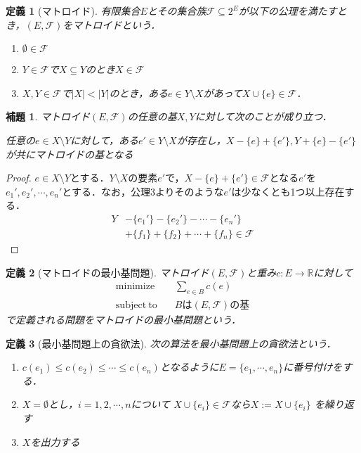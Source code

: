 \documentclass[a4paper]{jsarticle}
\newcommand{\abs}[1]{ \left| #1 \right| }
\theoremstyle{break}
\newtheorem{defi}{定義}[section]
\newtheorem{lemm}{補題}[section]
\newtheorem{proof}{証明}[section]
\begin{document}
\begin{defi}[マトロイド] 
  有限集合$E$とその集合族$\mathcal{F} \subseteq 2^E$が以下の公理を満たすとき，$(E,\mathcal{F})$をマトロイドという．
  \begin{enumerate}
    \item $\emptyset \in \mathcal{F}$
    \item $Y\in \mathcal{F}$で$X\subseteq Y$のとき$X\in \mathcal{F}$
    \item $X,Y\in \mathcal{F}$で$\abs{X}<\abs{Y}$のとき，ある$e\in Y\setminus X$があって$X\cup \{e\} \in \mathcal{F}$．
  \end{enumerate}
\end{defi}

\begin{lemm}
  マトロイド$(E,\mathcal{F})$の任意の基$X,Y$に対して次のことが成り立つ．

  任意の$e\in X\setminus Y$に対して，ある$e'\in Y\setminus X$が存在し，$X-\{e\}+\{e'\},Y+\{e\}-\{e'\}$が共にマトロイドの基となる
\end{lemm}
\begin{proof}
  $e\in X\setminus Y$とする．$Y\setminus X$の要素$e'$で，$X-\{e\}+\{e'\}\in \mathcal{F}$となる$e'$を$e_1',e_2',\cdots,e_n'$とする．なお，公理3よりそのような$e'$は少なくとも1つ以上存在する．
  \begin{align*}
    Y &- \{e_1'\} - \{e_2'\} - \cdots - \{e_n'\}  \\
      & + \{f_1\} + \{f_2\} + \cdots + \{f_n\} \in \mathcal{F}
  \end{align*}
\end{proof}

\begin{defi}[マトロイドの最小基問題] 
  マトロイド$(E,\mathcal{F})$と重み$c\colon E\to \mathbb{R}$に対して
  \begin{align*}
    \mathrm{minimize} &\quad  \sum_{e\in B} c(e) \\
    \mathrm{subject\ to}  &\quad  Bは(E,\mathcal{F})の基
  \end{align*}
  で定義される問題をマトロイドの最小基問題という．
\end{defi}
\begin{defi}[最小基問題上の貪欲法] 
  次の算法を最小基問題上の貪欲法という．
  \begin{enumerate}
    \item $c(e_1) \leq c(e_2) \leq \cdots \leq c(e_n)$となるように$E=\{e_1,\cdots,e_n\}$に番号付けをする．
    \item $X=\emptyset$とし，$i=1,2,\cdots,n$について
      $X\cup \{e_i\} \in \mathcal{F}$なら$X:=X\cup \{e_i\}$
      を繰り返す
    \item $X$を出力する
  \end{enumerate}
\end{defi}
\end{document}
